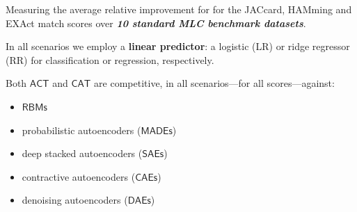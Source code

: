 \documentclass[xcolor={usenames,dvipsnames,svgnames}, compress]{beamer}
\newcommand{\highlight}[2][yellow]{\mathchoice%
  {\colorbox{#1}{\textcolor{white}{$\displaystyle{#2}$}}}%
  {\colorbox{#1}{\textcolor{white}{$\textstyle{#2}$}}}%
  {\colorbox{#1}{\textcolor{white}{$\scriptstyle{#2}$}}}%
  {\colorbox{#1}{\textcolor{white}{$\scriptscriptstyle{#2}$}}}}%
\begin{document}
\begin{frame}[t]
\begin{minipage}{0.47\linewidth}

  Measuring the average relative improvement for for the \textsf{JAC}card,
  \textsf{HAM}ming and \textsf{EXA}ct match scores
  over \emph{\textbf{10 standard MLC benchmark datasets}}.\par\bigskip
  
  In all scenarios we employ a \textbf{linear predictor}: a logistic
  (\textsf{LR}) or ridge regressor (\textsf{RR}) for classification or
  regression, respectively.\par\bigskip
  
  Both $\mathsf{ACT}$ and $\mathsf{CAT}$ are competitive, in all
  scenarios---for all scores---against:
  \begin{itemize}
  \item $\mathsf{RBMs}$
  \item probabilistic autoencoders ($\mathsf{MADEs}$)
  \item deep stacked autoencoders ($\mathsf{SAEs}$)
  \item contractive autoencoders ($\mathsf{CAEs}$)
    \item denoising autoencoders ($\mathsf{DAEs}$)
  \end{itemize}


\end{minipage}
  \end{frame}
\end{document}
